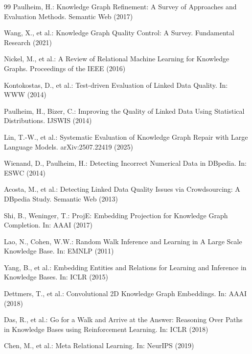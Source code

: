 \documentclass[runningheads]{llncs}
\begin{document}
\begin{thebibliography}{99}
Paulheim, H.: Knowledge Graph Refinement: A Survey of Approaches and Evaluation Methods. Semantic Web (2017)

Wang, X., et al.: Knowledge Graph Quality Control: A Survey. Fundamental Research (2021)

Nickel, M., et al.: A Review of Relational Machine Learning for Knowledge Graphs. Proceedings of the IEEE (2016)

Kontokostas, D., et al.: Test-driven Evaluation of Linked Data Quality. In: WWW (2014)

Paulheim, H., Bizer, C.: Improving the Quality of Linked Data Using Statistical Distributions. IJSWIS (2014)

Lin, T.-W., et al.: Systematic Evaluation of Knowledge Graph Repair with Large Language Models. arXiv:2507.22419 (2025)

Wienand, D., Paulheim, H.: Detecting Incorrect Numerical Data in DBpedia. In: ESWC (2014)

Acosta, M., et al.: Detecting Linked Data Quality Issues via Crowdsourcing: A DBpedia Study. Semantic Web (2013)

Shi, B., Weninger, T.: ProjE: Embedding Projection for Knowledge Graph Completion. In: AAAI (2017)

Lao, N., Cohen, W.W.: Random Walk Inference and Learning in A Large Scale Knowledge Base. In: EMNLP (2011)

Yang, B., et al.: Embedding Entities and Relations for Learning and Inference in Knowledge Bases. In: ICLR (2015)

Dettmers, T., et al.: Convolutional 2D Knowledge Graph Embeddings. In: AAAI (2018)

Das, R., et al.: Go for a Walk and Arrive at the Answer: Reasoning Over Paths in Knowledge Bases using Reinforcement Learning. In: ICLR (2018)

Chen, M., et al.: Meta Relational Learning. In: NeurIPS (2019)
\end{thebibliography}
\end{document}
